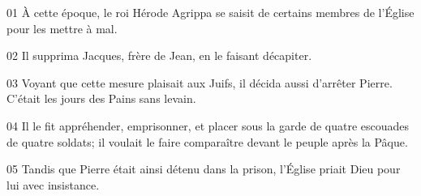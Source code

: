 01 À cette époque, le roi Hérode Agrippa se saisit de certains membres de l’Église pour les mettre à mal.

02 Il supprima Jacques, frère de Jean, en le faisant décapiter.

03 Voyant que cette mesure plaisait aux Juifs, il décida aussi d’arrêter Pierre. C’était les jours des Pains sans levain.

04 Il le fit appréhender, emprisonner, et placer sous la garde de quatre escouades de quatre soldats; il voulait le faire comparaître devant le peuple après la Pâque.

05 Tandis que Pierre était ainsi détenu dans la prison, l’Église priait Dieu pour lui avec insistance.
